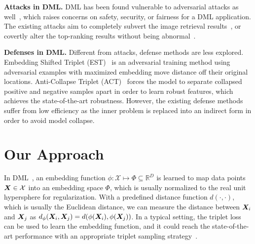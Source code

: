 \documentclass[10pt,twocolumn,letterpaper]{article}
\begin{document}
\textbf{Attacks in DML.}
%
DML has been found vulnerable to adversarial attacks as
well~\cite{advrank,advorder,robrank}, which raises concerns on safety,
security, or fairness for a DML application.
%
The existing attacks aim to completely subvert the image retrieval
results~\cite{qair,learn-to-misrank,advdpqn,advpattern,flowertower,universalret},
or covertly alter the top-ranking results without being
abnormal~\cite{advrank,advorder}.

%
\textbf{Defenses in DML.} Different from attacks, defense methods are less
explored.
%
Embedding Shifted Triplet (EST)~\cite{advrank} is an
adversarial training method using adversarial examples with maximized embedding
move distance off their original locations.
%
Anti-Collapse Triplet (ACT)~\cite{robrank} forces the model to separate
collapsed positive and negative samples apart in order to learn robust
features, which achieves the state-of-the-art robustness.
%
However, the existing defense methods suffer from low efficiency as the
inner problem is replaced into an indirect form in order to avoid model collapse.

\section{Our Approach}
\label{sec:3}


In DML~\cite{revisiting,dmlreality}, an embedding
function $\phi:\mathcal{X}\mapsto \Phi \subseteq \mathbb{R}^D$ is learned to
map data points ${\bm{X}}\in\mathcal{X}$ into an embedding space $\Phi$, which is usually
normalized to the real unit hypersphere for regularization.
%
With a predefined distance function $d(\cdot,\cdot)$, which is usually the
Euclidean distance, we can measure the distance between ${\bm{X}}_i$ and ${\bm{X}}_j$ as
$d_\phi({\bm{X}}_i,{\bm{X}}_j)=d(\phi({\bm{X}}_i),\phi({\bm{X}}_j))$.
%
In a typical setting, the triplet loss~\cite{facenet} can be used to learn the
embedding function, and it could reach the state-of-the-art performance with an
appropriate triplet sampling strategy~\cite{revisiting}.

\end{document}
